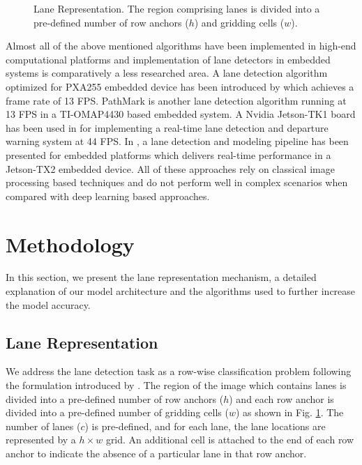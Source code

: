 \documentclass[conference]{IEEEtran}
\begin{document}
\begin{figure}
 \caption{Lane Representation. The region comprising lanes is divided into a pre-defined number of row anchors ($h$) and gridding cells ($w$).}
    \vspace{-0.3cm}
    \label{fig:lane_rep}
\end{figure}

Almost all of the above mentioned algorithms have been implemented in high-end computational platforms and implementation of lane detectors in embedded systems is comparatively a less researched area. A lane detection algorithm optimized for PXA255 embedded device has been introduced by \cite{Ming07real} which achieves a frame rate of 13 FPS. PathMark \cite{pathmark} is another lane detection algorithm running at 13 FPS in a TI-OMAP4430 based embedded system. A Nvidia Jetson-TK1 board has been used in \cite{lanedeparture} for implementing a real-time lane detection and departure warning system at 44 FPS. In \cite{marcos18fast}, a lane detection and modeling pipeline has been presented for embedded platforms which delivers real-time performance in a Jetson-TX2 embedded device. All of these approaches rely on classical image processing based techniques and do not perform well in complex scenarios when compared with deep learning based approaches. 




\section{Methodology}
\label{sec:method}
In this section, we present the lane representation mechanism, a detailed explanation of our model architecture and the algorithms used to further increase the model accuracy.

\subsection{Lane Representation}
\label{ssec:laneRep}

We address the lane detection task as a row-wise classification problem following the formulation introduced by \cite{qin2020ultra}. The region of the image which contains lanes is divided into a pre-defined number of row anchors ($h$) and each row anchor is divided into a pre-defined number of gridding cells ($w$) as shown in Fig. \ref{fig:lane_rep}. The number of lanes ($c$) is pre-defined, and for each lane, the lane locations are represented by a $h \times w$ grid. An additional cell is attached to the end of each row anchor to indicate the absence of a particular lane in that row anchor.
\end{document}
